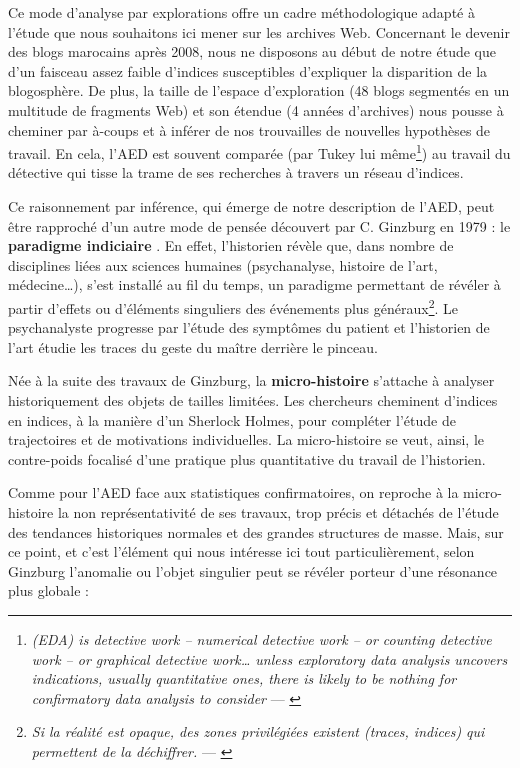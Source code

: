 \documentclass[symmetric,justified,marginals=raggedouter]{tufte-book}
\begin{document}
\noindent Ce mode d'analyse par explorations offre un cadre méthodologique adapté à l'étude que nous souhaitons ici mener sur les archives Web. Concernant le devenir des blogs marocains après 2008, nous ne disposons au début de notre étude que d'un faisceau assez faible d'indices susceptibles d'expliquer la disparition de la blogosphère. De plus, la taille de l'espace d'exploration (48 blogs segmentés en un multitude de fragments Web) et son étendue (4 années d'archives) nous pousse à cheminer par à-coups et à inférer de nos trouvailles de nouvelles hypothèses de travail. En cela, l'AED est souvent comparée (par Tukey lui même\footnote{\RaggedOuter \og\textit{(EDA) is detective work – numerical detective work – or counting detective work – or graphical detective work\ldots{} unless exploratory data analysis uncovers indications, usually quantitative ones, there is likely to be nothing for confirmatory data analysis to consider}\fg{} --- \citep[p.1-3]{tukey_exploratory_1977}}) au travail du détective qui tisse la trame de ses recherches à travers un réseau d'indices. 

Ce raisonnement par inférence, qui émerge de notre description de l'AED, peut être rapproché d'un autre mode de pensée découvert par C. Ginzburg en 1979 : le \textbf{paradigme indiciaire} \citep{ginzburg_signes_1980}. En effet, l'historien révèle que, dans nombre de disciplines liées aux sciences humaines (psychanalyse, histoire de l'art, médecine\ldots{}), s'est installé au fil du temps, un paradigme permettant de révéler à partir d'effets ou d'éléments singuliers des événements plus généraux\footnote{\RaggedOuter \og\textit{Si la réalité est opaque, des zones privilégiées existent (traces, indices) qui permettent de la déchiffrer.}\fg{} --- \citep[p.290]{ginzburg_mythes_2012}}. Le psychanalyste progresse par l'étude des symptômes du patient et l'historien de l'art étudie les traces du geste du maître derrière le pinceau.

Née à la suite des travaux de Ginzburg, la \textbf{micro-histoire} s'attache à analyser historiquement des objets de tailles limitées. Les chercheurs cheminent d'indices en indices, à la manière d'un Sherlock Holmes, pour compléter l'étude de trajectoires et de motivations individuelles. La micro-histoire se veut, ainsi, le contre-poids focalisé d'une pratique plus quantitative du travail de l'historien. 

Comme pour l'AED face aux statistiques confirmatoires, on reproche à la micro-histoire la non représentativité de ses travaux, trop précis et détachés de l'étude des tendances historiques normales et des grandes structures de masse. Mais, sur ce point, et c'est l'élément qui nous intéresse ici tout particulièrement, selon Ginzburg l'anomalie ou l'objet singulier peut se révéler porteur d'une résonance plus globale :\\
\end{document}
